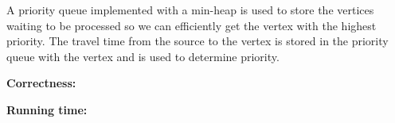 \documentclass[11pt]{article}
\newcommand\correctness{\vspace{.10in}\textbf{Correctness: }}
\newcommand\runtime{\vspace{.10in}\textbf{Running time: }}
\begin{document}
A priority queue implemented with a min-heap is used to store the vertices waiting to be processed so we can efficiently get the vertex with the highest priority. The travel time from the source to the vertex is stored in the priority queue with the vertex and is used to determine priority.

\correctness

\runtime
\end{document}
